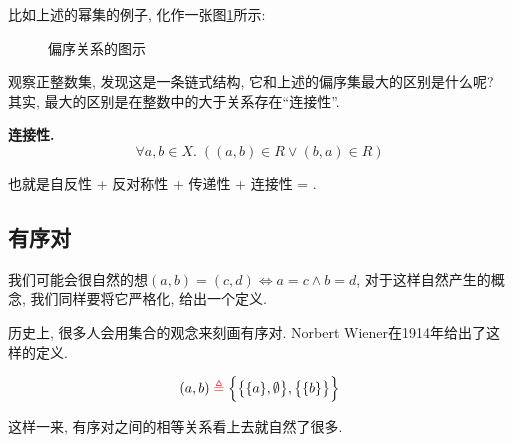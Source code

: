 比如上述的幂集的例子, 化作一张图\ref{fig:part-order-fig}所示: 
\begin{figure}[!htbp]
	\begin{center}
	\end{center}
	\caption{偏序关系的图示}
	\label{fig:part-order-fig}
\end{figure}

观察正整数集, 发现这是一条链式结构, 它和上述的偏序集最大的区别是什么呢? 其实, 最大的区别是在整数中的大于关系存在``连接性''. 

\textbf{连接性.} 
$$
\forall a, b \in X.\; ((a, b) \in R \lor (b, a) \in R)
$$

也就是自反性 + 反对称性 + 传递性 + 连接性 = . 

\subsection{有序对}

我们可能会很自然的想$ (a, b) = (c, d) \iff a = c \land b = d$, 对于这样自然产生的概念, 我们同样要将它严格化, 给出一个定义.  

历史上, 很多人会用集合的观念来刻画有序对. Norbert Wiener在1914年给出了这样的定义. 

\begin{definition}
    \[
      (a, b) \;\textcolor{red}{\triangleq}\; \Big\{\big\{\{a\}, \emptyset\big\}, \big\{\{b\}\big\}\Big\}
    \]
\end{definition}

这样一来, 有序对之间的相等关系看上去就自然了很多. 

